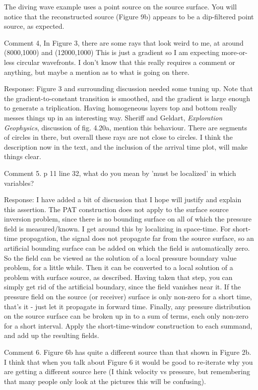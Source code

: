 \documentclass[12pt]{article}
\begin{document}
The diving wave example uses a point source on the source surface. You will notice that the reconstructed source (Figure 9b) appears to be a dip-filtered point source, as expected.

Comment 4, In Figure 3, there are some rays that look weird to me, at around (8000,1000) and (12000,1000) This is just a gradient so I am expecting more-or-less circular wavefronts.  I don't know that this really requires a comment or anything, but maybe a mention as to what is going on there.  

Response: Figure 3 and surrounding discussion needed some tuning up. Note that the gradient-to-constant transition is smoothed, and the gradient is large enough to generate a triplication. Having homogeneous layers top and bottom really messes things up in an interesting way. Sheriff and Geldart, {\em Exploration Geophysics}, discussion of fig. 4.20a, mention this behaviour. There are segments of circles in there, but overall these rays are not close to circles. I think the description now in the text, and the inclusion of the arrival time plot, will make things clear.

Comment 5. p 11 line 32, what do you mean by 'must be localized' in which variables?

Response: I have added a bit of discussion that I hope will justify and explain this assertion. The PAT construction does not apply to the surface source inversion problem, since there is no bounding surface on all of which the pressure field is measured/known. I get around this by localizing in space-time. For short-time propagation, the signal does not propagate far from the source surface, so an artificial bounding surface can be added on which the field is automatically zero. So the field can be viewed as the solution of a local pressure boundary value problem, for a little while. Then it can be converted to a local solution of a problem with surface source, as described. Having taken that step, you can simply get rid of the artificial boundary, since the field vanishes near it. If the pressure field on the source (or receiver) surface is only non-zero for a short time, that's it - just let it propagate in forward time. Finally, any pressure distribution on the source surface can be broken up in to a sum of terms, each only non-zero for a short interval. Apply the short-time-window construction to each summand, and add up the resulting fields.

Comment 6. Figure 6b has quite a different source than that shown in Figure 2b.  I think that when you talk about Figure 6 it would be good to re-iterate why you are getting a different source here (I think velocity vs pressure, but remembering that many people only look at the pictures this will be confusing).
\end{document}
